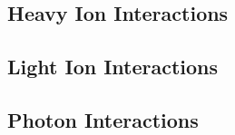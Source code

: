\subsection{Heavy Ion Interactions}

\subsection{Light Ion Interactions}

\subsection{Photon Interactions}
